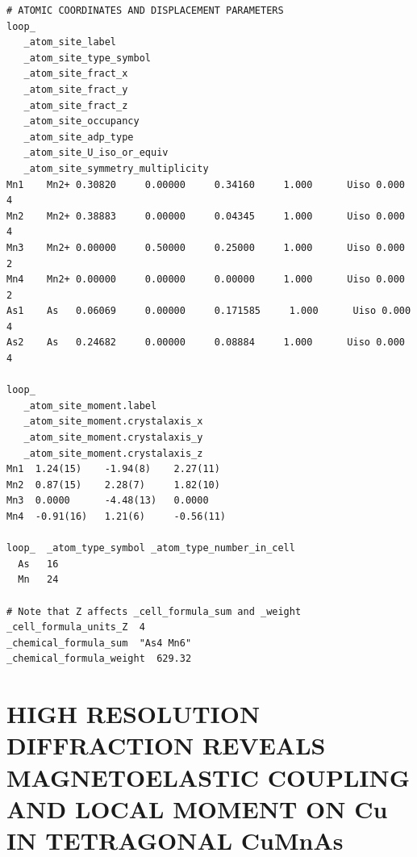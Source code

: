 \documentclass[letterpaper,10pt,doublespacing,edeposit]{uiucthesis2020}
\begin{document}
\begin{mainmatter}
\begin{verbatim}
# ATOMIC COORDINATES AND DISPLACEMENT PARAMETERS
loop_ 
   _atom_site_label
   _atom_site_type_symbol
   _atom_site_fract_x
   _atom_site_fract_y
   _atom_site_fract_z
   _atom_site_occupancy
   _atom_site_adp_type
   _atom_site_U_iso_or_equiv
   _atom_site_symmetry_multiplicity
Mn1    Mn2+ 0.30820     0.00000     0.34160     1.000      Uiso 0.000      4   
Mn2    Mn2+ 0.38883     0.00000     0.04345     1.000      Uiso 0.000      4   
Mn3    Mn2+ 0.00000     0.50000     0.25000     1.000      Uiso 0.000      2   
Mn4    Mn2+ 0.00000     0.00000     0.00000     1.000      Uiso 0.000      2   
As1    As   0.06069     0.00000     0.171585     1.000      Uiso 0.000      4   
As2    As   0.24682     0.00000     0.08884     1.000      Uiso 0.000      4   

loop_
   _atom_site_moment.label
   _atom_site_moment.crystalaxis_x
   _atom_site_moment.crystalaxis_y
   _atom_site_moment.crystalaxis_z
Mn1  1.24(15)    -1.94(8)    2.27(11)    
Mn2  0.87(15)    2.28(7)     1.82(10)    
Mn3  0.0000      -4.48(13)   0.0000      
Mn4  -0.91(16)   1.21(6)     -0.56(11)   

loop_  _atom_type_symbol _atom_type_number_in_cell
  As   16
  Mn   24

# Note that Z affects _cell_formula_sum and _weight
_cell_formula_units_Z  4
_chemical_formula_sum  "As4 Mn6"
_chemical_formula_weight  629.32
\end{verbatim}

\chapter{HIGH RESOLUTION DIFFRACTION REVEALS MAGNETOELASTIC COUPLING AND LOCAL MOMENT ON Cu IN TETRAGONAL CuMnAs}

\vspace{15mm}


\end{mainmatter}
\end{document}
